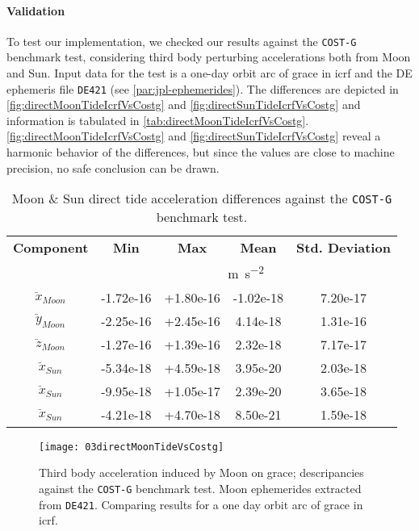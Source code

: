 \paragraph{Validation}\label{sssec:third-body-perurbation-validation}

To test our implementation, we checked our results against the \texttt{COST-G} 
benchmark test, considering third body perturbing accelerations both from Moon and Sun. 
Input data for the test is a one-day orbit arc of \gls{grace} in \gls{icrf} and 
the DE ephemeris file \texttt{DE421} (see \autoref{par:jpl-ephemerides}). 
The differences are depicted in \autoref{fig:directMoonTideIcrfVsCostg} and \autoref{fig:directSunTideIcrfVsCostg} 
and information is tabulated in \autoref{tab:directMoonTideIcrfVsCostg}.
\autoref{fig:directMoonTideIcrfVsCostg} and \autoref{fig:directSunTideIcrfVsCostg} reveal a 
harmonic behavior of the differences, but since the values are close to machine precision, 
no safe conclusion can be drawn.

\begin{table}[]
  \centering
  \begin{tabular}{ccccc}
      \textbf{Component} & \textbf{Min} & \textbf{Max} & \textbf{Mean} & \textbf{Std. Deviation}\\
      & \multicolumn{4}{c}{\si{\metre\per\square\second}} \\
      \hline
      $\ddot{x}_{Moon}$ & -1.72e-16 & +1.80e-16 & -1.02e-18 & 7.20e-17 \\ 
      $\ddot{y}_{Moon}$ & -2.25e-16 & +2.45e-16 & 4.14e-18  & 1.31e-16 \\
      $\ddot{z}_{Moon}$ & -1.27e-16 & +1.39e-16 & 2.32e-18  & 7.17e-17 \\
      $\ddot{x}_{Sun}$  & -5.34e-18 & +4.59e-18 & 3.95e-20  & 2.03e-18 \\
      $\ddot{x}_{Sun}$  & -9.95e-18 & +1.05e-17 & 2.39e-20  & 3.65e-18 \\
      $\ddot{x}_{Sun}$  & -4.21e-18 & +4.70e-18 & 8.50e-21  & 1.59e-18 \\
      \hline
  \end{tabular}
  \caption{Moon \& Sun direct tide acceleration differences against the \texttt{COST-G} benchmark test.}
  \label{tab:directMoonTideIcrfVsCostg}
\end{table}

\begin{figure}
  \centering
  \texttt{[image: 03directMoonTideVsCostg]}
  \caption{Third body acceleration induced by Moon on \gls{grace}; descripancies 
   against the \texttt{COST-G} benchmark test. Moon ephemerides extracted from \texttt{DE421}.
   Comparing results for a one day orbit arc of \gls{grace} in \gls{icrf}.}
  \label{fig:directMoonTideIcrfVsCostg}
\end{figure}

